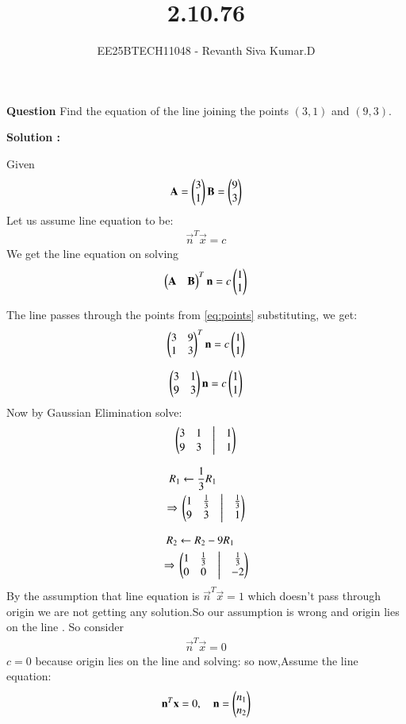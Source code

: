 \documentclass[journal]{IEEEtran}
\begin{document}

\vspace{3cm}

\title{2.10.76}
\author{EE25BTECH11048 - Revanth Siva Kumar.D}
{\let\newpage\relax\maketitle}
\textbf{Question}
Find the equation of the line joining the points $(3,1)$ and $(9,3)$. 

\textbf{Solution :} 

Given 
\begin{align}
    \mathbf{A}=\begin{pmatrix}3\\1\end{pmatrix} \mathbf{B}=\begin{pmatrix}9\\3\end{pmatrix} 
    \label{eq:points}
\end{align}
Let us assume line equation to be:
\begin{align}
    \vec{n}^T \vec{x} = c
\end{align} 
    We get the line equation on solving \[\begin{pmatrix}\mathbf{A}&\mathbf{B}\end{pmatrix}^T\mathbf{n}=c\begin{pmatrix}1\\1\end{pmatrix}\] 

The line passes through the points from \eqref{eq:points} substituting, we get:
\begin{align}
    \begin{pmatrix}3 & 9 \\
       1 & 3  \end{pmatrix}^T\mathbf{n}=c\begin{pmatrix}1 \\ 1\end{pmatrix}
\end{align}

\begin{align}
    \begin{pmatrix}3 & 1 \\
       9 & 3  \end{pmatrix}\mathbf{n}=c\begin{pmatrix}1 \\ 1\end{pmatrix}
\end{align}
Now by Gaussian Elimination solve:
\begin{align}
\begin{pmatrix}3 & 1 & \big| & 1 \\
         9 & 3 & \big| & 1 \end{pmatrix}
\end{align}

\begin{align}
R_{1} &\leftarrow \frac{1}{3}R_{1} \nonumber\\
\Rightarrow\ 
&\myvec{1 & \frac{1}{3} & \big| & \frac{1}{3} \\
         9 & 3 & \big| & 1 }
\end{align}

\begin{align}
R_{2} &\leftarrow R_{2}-9R_{1} \nonumber\\
\Rightarrow\ 
&\myvec{1 & \frac{1}{3} & \big| & \frac{1}{3} \\
         0 & 0 & \big| & -2 }
\end{align}
By the assumption that line equation is $\vec{n}^T\vec{x}=1$ which doesn't pass through origin we are not getting any solution.So our assumption is wrong and origin lies on the line . 
So consider \begin{align}
    \vec{n}^T \vec{x} = 0
\end{align} 
$c=0$ because origin lies on the line and solving:
so now,Assume the line equation:
\[
\mathbf{n}^T \mathbf{x} = 0, \quad 
\mathbf{n} = \begin{pmatrix}n_1\\n_2\end{pmatrix}
\]
\end{document}
